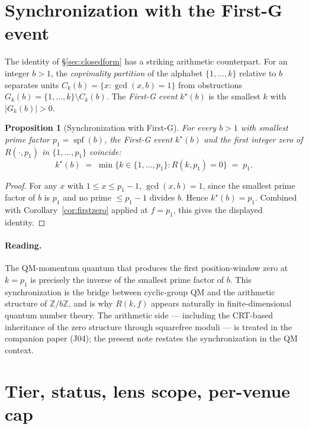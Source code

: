 \documentclass[11pt,reqno]{amsart}
\theoremstyle{plain}
\newtheorem{proposition}[theorem]{Proposition}
\theoremstyle{definition}
\theoremstyle{remark}
\newcommand{\Z}{\mathbb{Z}}
\newcommand{\spf}{\operatorname{spf}}
\begin{document}
\section{Synchronization with the First-G event}
\label{sec:firstg}

The identity of \S\ref{sec:closedform} has a striking arithmetic counterpart. For an
integer $b > 1$, the \emph{coprimality partition} of the alphabet $\{1,\dots,k\}$
relative to $b$ separates units $C_{k}(b) = \{x : \gcd(x,b) = 1\}$ from obstructions
$G_{k}(b) = \{1,\dots,k\}\setminus C_{k}(b)$. The \emph{First-G event} $k^{\star}(b)$ is
the smallest $k$ with $|G_{k}(b)| > 0$.

\begin{proposition}[Synchronization with First-G]
\label{prop:firstg}
For every $b > 1$ with smallest prime factor $p_{1} = \spf(b)$, the First-G event
$k^{\star}(b)$ and the first integer zero of $R(\cdot,p_{1})$ in $\{1,\dots,p_{1}\}$
coincide:
\[
  k^{\star}(b) \;=\; \min\{k \in \{1,\dots,p_{1}\} : R(k,p_{1}) = 0\} \;=\; p_{1}.
\]
\end{proposition}

\begin{proof}
For any $x$ with $1 \le x \le p_{1} - 1$, $\gcd(x,b) = 1$, since the smallest prime
factor of $b$ is $p_{1}$ and no prime $\le p_{1}-1$ divides $b$. Hence
$k^{\star}(b) = p_{1}$. Combined with Corollary~\ref{cor:firstzero} applied at
$f = p_{1}$, this gives the displayed identity.
\end{proof}

\paragraph{Reading.}
The QM-momentum quantum that produces the first position-window zero at $k = p_{1}$ is
precisely the inverse of the smallest prime factor of $b$. This synchronization is the
bridge between cyclic-group QM and the arithmetic structure of $\Z/b\Z$, and is why
$R(k,f)$ appears naturally in finite-dimensional quantum number theory. The arithmetic
side --- including the CRT-based inheritance of the zero structure through squarefree
moduli --- is treated in the companion paper \cite{SandersGishSincZero} (J04); the
present note restates the synchronization in the QM context.

\section{Tier, status, lens scope, per-venue cap}
\label{sec:tier}
\end{document}

